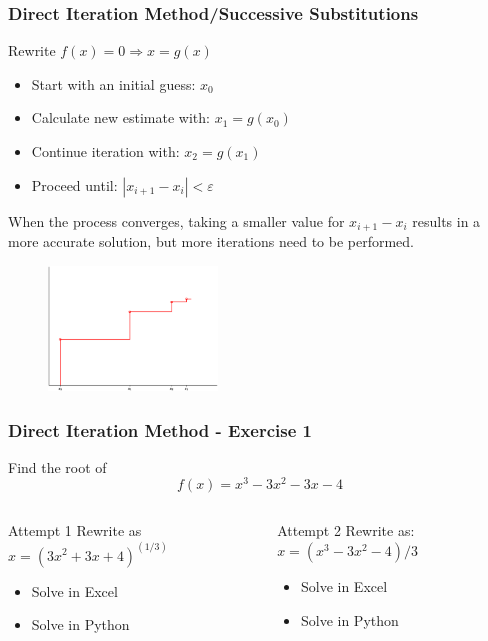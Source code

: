 \begin{frame}[fragile]
  \frametitle{Direct Iteration Method/Successive Substitutions}

  Rewrite \( f(x) = 0 \Rightarrow  x = g(x) \)
  \begin{itemize}
    \item Start with an initial guess: \( x_0 \)
    \item Calculate new estimate with: \( x_1 = g(x_0) \)
    \item Continue iteration with: \( x_2 = g(x_1) \)
    \item Proceed until: \( |x_{i+1} - x_i| <  \varepsilon \)
  \end{itemize}

  When the process converges, taking a smaller value for \( x_{i+1} - x_i \) results in a more accurate solution, but more iterations need to be performed.
  \begin{figure}
    \includegraphics[width=0.4\textwidth]{direct_iteration_photo.eps}
  \end{figure}
\end{frame}


\begin{frame}[fragile,label=practice_nonlin1]
  \frametitle{Direct Iteration Method - Exercise 1}

  Find the root of
  \[
    f(x) = x^3 -3x^2 - 3x - 4
  \]
  \pause
  \begin{columns}[T]
    \begin{block}{Attempt 1}
      Rewrite as
      \(
      x = (3x^2 + 3x + 4)^{(1/3)}
      \)
      \begin{itemize}
        \item Solve in Excel
        \item Solve in Python
      \end{itemize}    
    \end{block}
    \pause
    \begin{block}{Attempt 2}
      Rewrite as:
      \(
      x = (x^3 - 3x^2 - 4)/3
      \)
      \begin{itemize}
        \item Solve in Excel
        \item Solve in Python
      \end{itemize}
    \end{block}
  \end{columns}
\end{frame}

